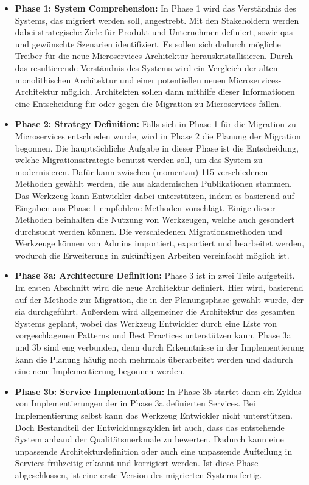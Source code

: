 \begin{itemize}
	\item \textbf{Phase 1: System Comprehension:}
	In Phase 1 wird das Verständnis des Systems, das migriert werden soll, angestrebt.
	Mit den Stakeholdern werden dabei strategische Ziele für Produkt und Unternehmen definiert, sowie \glspl{qa} und gewünschte Szenarien identifiziert.
	Es sollen sich dadurch mögliche Treiber für die neue Microservices-Architektur herauskristallisieren.
	Durch das resultierende Verständnis des Systems wird ein Vergleich der alten monolithischen Architektur und einer potentiellen neuen Microservices-Architektur möglich.
	Architekten sollen dann mithilfe dieser Informationen eine Entscheidung für oder gegen die Migration zu Microservices fällen.
	\item \textbf{Phase 2: Strategy Definition:}
	Falls sich in Phase 1 für die Migration zu Microservices entschieden wurde, wird in Phase 2 die Planung der Migration begonnen.
	Die hauptsächliche Aufgabe in dieser Phase ist die Entscheidung, welche Migrationsstrategie benutzt werden soll, um das System zu modernisieren.
	Dafür kann zwischen (momentan) 115 verschiedenen Methoden gewählt werden, die aus akademischen Publikationen stammen.
	Das Werkzeug kann Entwickler dabei unterstützen, indem es basierend auf Eingaben aus Phase 1 empfohlene Methoden vorschlägt.
	Einige dieser Methoden beinhalten die Nutzung von Werkzeugen, welche auch gesondert durchsucht werden können.
	Die verschiedenen Migrationsmethoden und Werkzeuge können von Admins importiert, exportiert und bearbeitet werden, wodurch die Erweiterung in zukünftigen Arbeiten vereinfacht möglich ist.
	\item \textbf{Phase 3a: Architecture Definition:}
	Phase 3 ist in zwei Teile aufgeteilt.
	Im ersten Abschnitt wird die neue Architektur definiert.
	Hier wird, basierend auf der Methode zur Migration, die in der Planungsphase gewählt wurde, der \gls{sia} durchgeführt.
	Außerdem wird allgemeiner die Architektur des gesamten Systems geplant, wobei das Werkzeug Entwickler durch eine Liste von vorgeschlagenen Patterns und Best Practices unterstützen kann.
	Phase 3a und 3b sind eng verbunden, denn durch Erkenntnisse in der Implementierung kann die Planung häufig noch mehrmals überarbeitet werden und dadurch eine neue Implementierung begonnen werden.
	\item \textbf{Phase 3b: Service Implementation:} In Phase 3b startet dann ein Zyklus von Im\-ple\-men\-tie\-rung\-en der in Phase 3a definierten Services.
	Bei Implementierung selbst kann das Werkzeug Entwickler nicht unterstützen.
	Doch Bestandteil der Entwicklungszyklen ist auch, dass das entstehende System anhand der Qualitätsmerkmale zu bewerten.
	Dadurch kann eine unpassende Architekturdefinition oder auch eine unpassende Aufteilung in Services frühzeitig erkannt und korrigiert werden.
	Ist diese Phase abgeschlossen, ist eine erste Version des migrierten Systems fertig.
\end{itemize}

